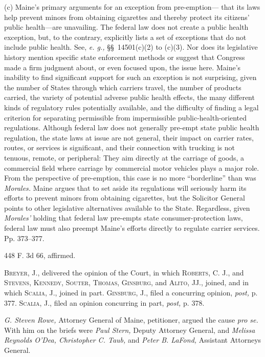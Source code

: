   (c) Maine's primary arguments for an exception from pre-emption---
that its laws help prevent minors from obtaining cigarettes and
thereby protect its citizens' public health---are unavailing. The
federal law does not create a public health exception, but, to the
contrary, explicitly lists a set of exceptions that do not include
public health. See, \emph{e. g.,} \S\S~14501(c)(2) to (c)(3). Nor
does its legislative history mention specific state enforcement methods
or suggest that Congress made a firm judgment about, or even focused
upon, the issue here. Maine's inability to find significant support
for such an exception is not surprising, given the number of States
through which carriers travel, the number of products carried, the
variety of potential adverse public health effects, the many different
kinds of regulatory rules potentially available, and the difficulty of
finding a legal criterion for separating permissible from impermissible
public-health-oriented regulations. Although federal law does not
generally pre-empt state public health regulation, the state laws
at issue are not general, their impact on carrier rates, routes, or
services is significant, and their connection with trucking is not
tenuous, remote, or peripheral: They aim directly at the carriage of
goods, a commercial field where carriage by commercial motor vehicles
plays a major role. \newpage  From the perspective of pre-emption, this
case is no more ``borderline'' than was \emph{Morales.} Maine argues
that to set aside its regulations will seriously harm its efforts to
prevent minors from obtaining cigarettes, but the Solicitor General
points to other legislative alternatives available to the State.
Regardless, given \emph{Morales'} holding that federal law pre-empts
state consumer-protection laws, federal law must also preempt Maine's
efforts directly to regulate carrier services. Pp. 373--377.

448 F. 3d 66, affirmed.

  \textsc{Breyer,} J., delivered the opinion of the Court, in which
\textsc{Roberts,} C. J., and \textsc{Stevens, Kennedy, Souter, Thomas, Ginsburg,}
and \textsc{Alito, JJ.,} joined, and in which \textsc{Scalia,} J., joined in
part. \textsc{Ginsburg,} J., filed a concurring opinion, \emph{post,} p. 377.
\textsc{Scalia, J.,} filed an opinion concurring in part, \emph{post,} p. 378.

  \emph{G. Steven Rowe,} Attorney General of Maine, petitioner, argued the
cause \emph{pro se.} With him on the briefs were \emph{Paul Stern,} Deputy
Attorney General, and \emph{Melissa Reynolds O'Dea, Christopher C. Taub,}
and \emph{Peter B. LaFond,} Assistant Attorneys General.

